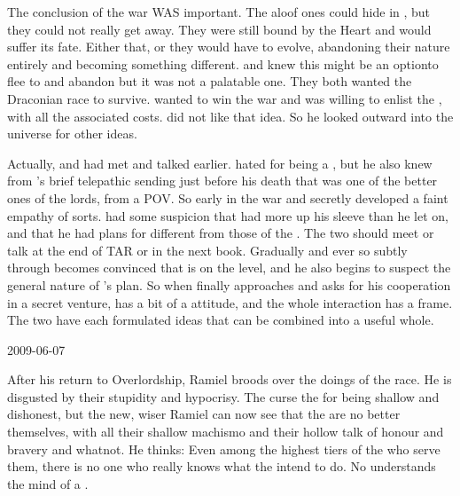 The conclusion of the war WAS important.
The aloof ones could hide in \Machai, but they could not really get away. 
They were still bound by the Heart and would suffer its fate.
Either that, or they would have to evolve, abandoning their \Draconic nature entirely and becoming something different.
\Ishnaruchaefir and \Secherdamon knew this might be an option\dash{}to flee to \Machai and abandon \dragonkind\dash{}but it was not a palatable one. 
They both wanted the Draconian race to survive.
\Secherdamon wanted to win the war and was willing to enlist the \xs, with all the associated costs.
\Ishnaruchaefir did not like that idea.
So he looked outward into the universe for other ideas.

Actually, \Ishnaruchaefir and \Azraid had met and talked earlier. 
\Ishnaruchaefir hated \Azraid for being a \sathariah, but he also knew from \Nexagglachel's brief telepathic sending just before his death that \Azraid was one of the better ones of the \resphan lords, from a \Draconic POV.
So early in the war \Ishnaruchaefir and \Azraid secretly developed a faint empathy of sorts.
\Ishnaruchaefir had some suspicion that \Azraid had more up his sleeve than he let on, and that he had plans for \Miith different from those of the \banelords.
The two should meet or talk at the end of TAR or in the next book.
Gradually and ever so subtly through  \Ishnaruchaefir becomes convinced that \Azraid is on the level, and he also begins to suspect the general nature of \Azraid's plan. 
So when \Azraid finally approaches \Ishnaruchaefir and asks for his cooperation in a secret venture, \Ishnaruchaefir has a bit of a  attitude, and the whole interaction has a  frame.
The two have each formulated ideas that can be combined into a useful whole.



2009-06-07

After his return to Overlordship, Ramiel broods over the doings of the \resphan race.
He is disgusted by their stupidity and hypocrisy. 
The \Mystraacht curse the \CiriathSepher for being shallow and dishonest, but the new, wiser Ramiel can now see that the \Mystraacht are no better themselves, with all their shallow machismo and their hollow talk of honour and bravery and whatnot.
He thinks: 
Even among the highest tiers of the \resphain who serve them, there is no one who really knows what the \banelords intend to do.
No \resphan understands the mind of a \bane.

